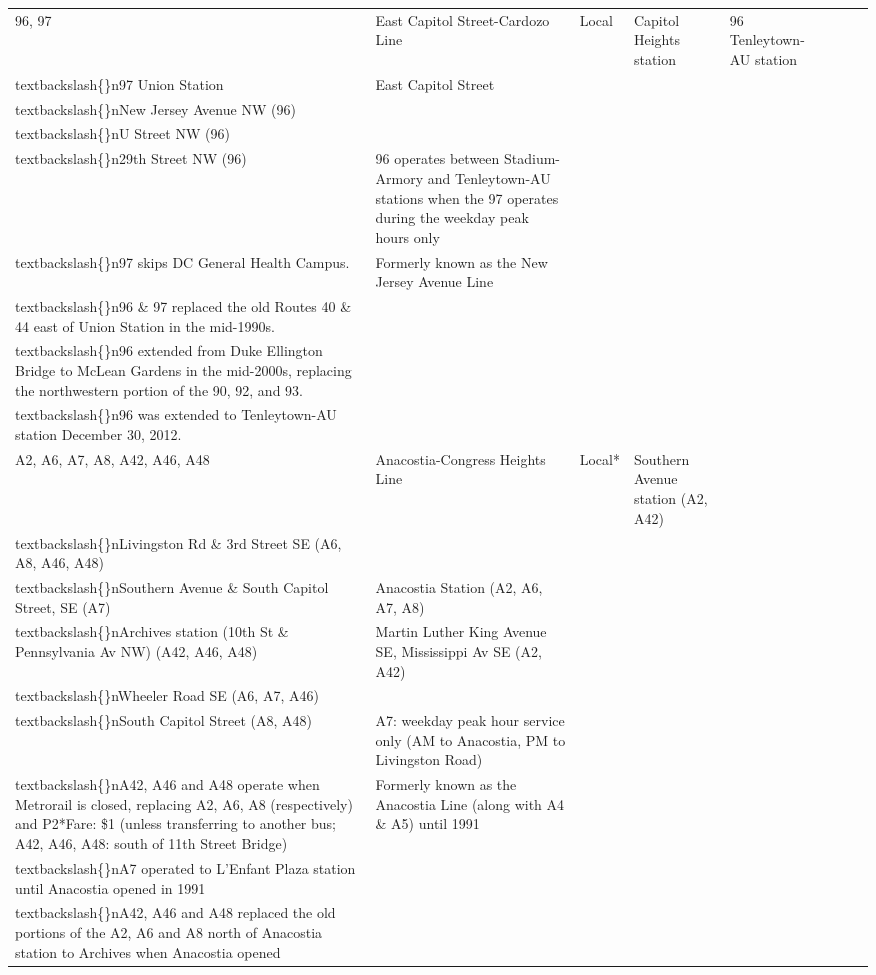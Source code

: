 \documentclass{article}
\begin{document}
\begin{tabular}{llllllll}
96, 97 & East Capitol Street-Cardozo Line & Local & Capitol Heights station & 96 Tenleytown-AU station\\textbackslash\{\}n97 Union Station & East Capitol Street\\textbackslash\{\}nNew Jersey Avenue NW (96)\\textbackslash\{\}nU Street NW (96)\\textbackslash\{\}n29th Street NW (96) & 96 operates between Stadium-Armory and Tenleytown-AU stations when the 97 operates during the weekday peak hours only\\textbackslash\{\}n97 skips DC General Health Campus. & Formerly known as the New Jersey Avenue Line\\textbackslash\{\}n96 \& 97 replaced the old Routes 40 \& 44 east of Union Station in the mid-1990s.\\textbackslash\{\}n96 extended from Duke Ellington Bridge to McLean Gardens in the mid-2000s, replacing the northwestern portion of the 90, 92, and 93.\\textbackslash\{\}n96 was extended to Tenleytown-AU station December 30, 2012. \\
A2, A6, A7, A8, A42, A46, A48 & Anacostia-Congress Heights Line & Local* & Southern Avenue station (A2, A42)\\textbackslash\{\}nLivingston Rd \& 3rd Street SE (A6, A8, A46, A48)\\textbackslash\{\}nSouthern Avenue \& South Capitol Street, SE (A7) & Anacostia Station (A2, A6, A7, A8)\\textbackslash\{\}nArchives station (10th St \& Pennsylvania Av NW) (A42, A46, A48) & Martin Luther King Avenue SE, Mississippi Av SE (A2, A42)\\textbackslash\{\}nWheeler Road SE (A6, A7, A46)\\textbackslash\{\}nSouth Capitol Street (A8, A48) & A7: weekday peak hour service only (AM to Anacostia, PM to Livingston Road)\\textbackslash\{\}nA42, A46 and A48 operate when Metrorail is closed, replacing A2, A6, A8 (respectively) and P2*Fare: \$1 (unless transferring to another bus; A42, A46, A48: south of 11th Street Bridge) & Formerly known as the Anacostia Line (along with A4 \& A5) until 1991\\textbackslash\{\}nA7 operated to L'Enfant Plaza station until Anacostia opened in 1991\\textbackslash\{\}nA42, A46 and A48 replaced the old portions of the A2, A6 and A8 north of Anacostia station to Archives when Anacostia opened \\

\end{tabular}
\end{document}
